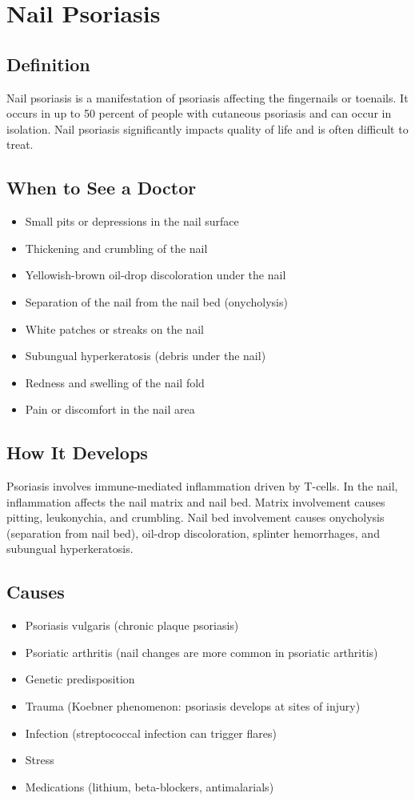 \chapter{Nail Psoriasis}

\section*{Definition}
Nail psoriasis is a manifestation of psoriasis affecting the fingernails or toenails. It occurs in up to 50 percent of people with cutaneous psoriasis and can occur in isolation. Nail psoriasis significantly impacts quality of life and is often difficult to treat.

\section*{When to See a Doctor}
\begin{itemize}
\item Small pits or depressions in the nail surface
\item Thickening and crumbling of the nail
\item Yellowish-brown oil-drop discoloration under the nail
\item Separation of the nail from the nail bed (onycholysis)
\item White patches or streaks on the nail
\item Subungual hyperkeratosis (debris under the nail)
\item Redness and swelling of the nail fold
\item Pain or discomfort in the nail area
\end{itemize}

\section*{How It Develops}
Psoriasis involves immune-mediated inflammation driven by T-cells. In the nail, inflammation affects the nail matrix and nail bed. Matrix involvement causes pitting, leukonychia, and crumbling. Nail bed involvement causes onycholysis (separation from nail bed), oil-drop discoloration, splinter hemorrhages, and subungual hyperkeratosis.

\section*{Causes}
\begin{itemize}
\item Psoriasis vulgaris (chronic plaque psoriasis)
\item Psoriatic arthritis (nail changes are more common in psoriatic arthritis)
\item Genetic predisposition
\item Trauma (Koebner phenomenon: psoriasis develops at sites of injury)
\item Infection (streptococcal infection can trigger flares)
\item Stress
\item Medications (lithium, beta-blockers, antimalarials)
\end{itemize}

